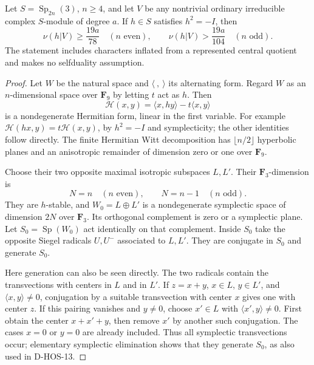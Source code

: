 \begin{theorem}
\label{D-HOS-18}
Let $S=\operatorname{Sp}_{2n}(3)$, $n\ge4$, and let $V$ be any
nontrivial ordinary irreducible complex $S$-module of degree $a$.
If $h\in S$ satisfies $h^2=-I$, then
\[
 \nu(h|V)\ge\frac{19a}{78}\quad(n\text{ even}),\qquad
 \nu(h|V)>\frac{19a}{104}\quad(n\text{ odd}).                 \tag{HOS3I.8}
\]
The statement includes characters inflated from a represented
central quotient and makes no selfduality assumption.
\end{theorem}

\begin{proof}
Let $W$ be the natural space and $\langle\ ,\ \rangle$ its
alternating form. Regard $W$ as an $n$-dimensional space over
$\mathbf F_9$ by letting $t$ act as $h$. Then
\[
 \mathcal H(x,y)=\langle x,hy\rangle-t\langle x,y\rangle       \tag{HOS3I.9}
\]
is a nondegenerate Hermitian form, linear in the first variable.
For example $\mathcal H(hx,y)=t\mathcal H(x,y)$, by
$h^2=-I$ and symplecticity; the other identities follow directly.
The finite Hermitian Witt decomposition has $\lfloor n/2\rfloor$
hyperbolic planes and an anisotropic remainder of dimension zero
or one over $\mathbf F_9$.

Choose their two opposite maximal isotropic subspaces $L,L'$.
Their $\mathbf F_3$-dimension is
\[
              N=n\quad(n\text{ even}),\qquad
              N=n-1\quad(n\text{ odd}).                     \tag{HOS3I.10}
\]
They are $h$-stable, and $W_0=L\oplus L'$ is a nondegenerate
symplectic space of dimension $2N$ over $\mathbf F_3$.
Its orthogonal complement is zero or a symplectic plane. Let
$S_0=\operatorname{Sp}(W_0)$ act identically on that complement.
Inside $S_0$ take the opposite Siegel radicals $U,U^-$ associated
to $L,L'$. They are conjugate in $S_0$ and generate $S_0$.

Here generation can also be seen directly. The two radicals contain
the transvections with centers in $L$ and in $L'$. If
$z=x+y$, $x\in L$, $y\in L'$, and $\langle x,y\rangle\ne0$,
conjugation by a suitable transvection with center $x$ gives one
with center $z$. If this pairing vanishes and $y\ne0$, choose
$x'\in L$ with $\langle x',y\rangle\ne0$. First obtain the
center $x+x'+y$, then remove $x'$ by another such conjugation.
The cases $x=0$ or $y=0$ are already included. Thus all symplectic
transvections occur; elementary symplectic elimination shows that
they generate $S_0$, as also used in D-HOS-13.


\end{proof}

